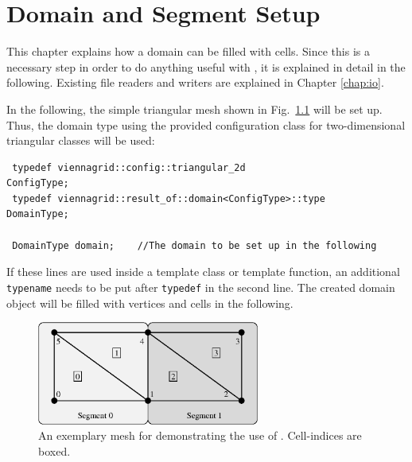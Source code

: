 \chapter{Domain and Segment Setup} \label{chap:domainsetup}
This chapter explains how a {\ViennaGrid} domain can be filled with cells. Since this
is a necessary step in order to do anything useful with {\ViennaGrid}, it is explained in detail in the following.
Existing file readers and writers are explained in Chapter \ref{chap:io}.


In the following, the simple triangular mesh shown in Fig.~\ref{fig:sampledomain} will be set up.
Thus, the domain type using the provided configuration class for two-dimensional triangular classes will be used:
\begin{lstlisting}
 typedef viennagrid::config::triangular_2d                  ConfigType;
 typedef viennagrid::result_of::domain<ConfigType>::type    DomainType;

 DomainType domain;    //The domain to be set up in the following
\end{lstlisting}
If these lines are used inside a template class or template function, an additional \lstinline|typename| needs to be put after \lstinline|typedef| in the second line.
The created domain object will be filled with vertices and cells in the following.

\begin{figure}[tb]
\centering
 \includegraphics[width=0.65\textwidth]{figures/sampledomain.eps}
 \caption{An exemplary mesh for demonstrating the use of {\ViennaGrid}. Cell-indices are boxed.}
 \label{fig:sampledomain}
\end{figure}


